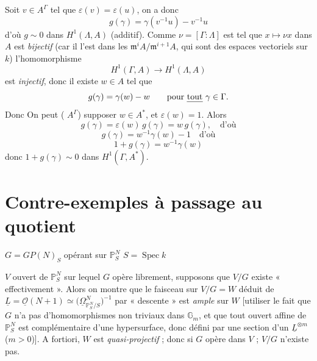 \documentclass[11pt,a4paper]{article}
\begin{document}
Soit $v \in A^{\Gamma}$ tel que $\varepsilon(v) = \varepsilon(u)$, on a donc
\[
  g(\gamma) = \gamma(v^{-1}u) - v^{-1}u
\]
d'où $g \sim 0$ dans $H^1(\Lambda, A)$ (additif). Comme $\nu = [\Gamma :
\Lambda]$ est tel que $x \mapsto \nu x$ dans $A$ est \emph{bijectif} (car il
l'est dans les $\mathfrak{m}^{i}A/\mathfrak{m}^{i+1}A$, qui sont des espaces
vectoriels sur $k$) l'homomorphisme
\[
  H^1(\Gamma, A) \longrightarrow H^1(\Lambda, A)
\]
est \emph{injectif}, donc il existe $w \in A$ tel que
\[
  g(\gamma) = \gamma(w) - w \qquad \text{pour \emph{tout} } \gamma \in \Gamma .
\]
Donc  On peut
( \struck{\ill{}}  $A^{\Gamma}$) supposer $w \in A^{*}$,
et  $\varepsilon(w) = 1$. Alors
 
\[
  g(\gamma) = \varepsilon(w)\,g(\gamma) = w\,g(\gamma), \quad \text{d'où}
\]
\[
  g(\gamma) = w^{-1}\gamma(w) - 1 \quad \text{d'où}
\]
\[
  1 + g(\gamma) = w^{-1}\gamma(w)
\]
donc $1 + g(\gamma) \sim 0$ dans $H^1(\Gamma, A^{*})$.

\section*{Contre-exemples à passage au quotient}




$G = GP(N)_S$ opérant sur $\mathbb{P}^N_S$ \qquad $S = \operatorname{Spec} k$

$V$ ouvert de $\mathbb{P}^N_S$ sur lequel $G$ opère
librement, supposons que $V/G$ existe « effectivement ». Alors on montre que
le faisceau sur $V/G = W$ déduit de
$\underline{L} = \underline{\mathcal{O}}(N+1) \simeq
\bigl(\underline{\Omega}^{N}_{\mathbb{P}^N_S/S}\bigr)^{-1}$ par « descente »
est \emph{ample} sur $W$ [utiliser le fait que $G$ n'a pas d'homomorphismes
non triviaux dans $\mathbb{G}_m$, et que tout ouvert affine de
$\mathbb{P}^N_S$ est complémentaire d'une hypersurface, \struck{\ill{}} donc
défini par une section d'un $\underline{L}^{\otimes m}$ ($m > 0$)]. A
fortiori, $W$ est \emph{quasi-projectif} ; \struck{\ill{}} donc si $G$ opère
 dans $V$ \ill{} \ill{} \ill{} \ill{} \ill{}
\ill{} ; $V/G$ n'existe pas.

\end{document}
